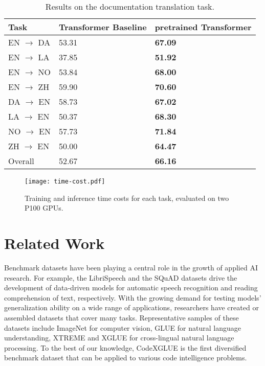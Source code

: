 \documentclass[sigconf,nonacm,screen]{acmart}
\begin{document}
\begin{table}[t]
	\begin{center}
	\caption{Results on the documentation translation task.}
		\begin{tabular}{lp{2cm}<{\centering}p{2cm}<{\centering}} 
			 \toprule 
			Task & Transformer Baseline & pretrained
			Transformer \\
\midrule
			EN $\rightarrow$ DA  & 53.31     &  \textbf{67.09}  \\
			EN $\rightarrow$ LA  & 37.85     &  \textbf{51.92}  \\
			EN $\rightarrow$ NO  & 53.84    &  \textbf{68.00}  \\
			EN $\rightarrow$ ZH  & 59.90     &  \textbf{70.60}  \\
			 \midrule
			DA $\rightarrow$ EN  & 58.73     &  \textbf{67.02}  \\
			LA $\rightarrow$ EN  & 50.37     &  \textbf{68.30}  \\
			NO $\rightarrow$ EN  & 57.73     &  \textbf{71.84}  \\
			ZH $\rightarrow$ EN  & 50.00     &  \textbf{64.47}  \\
			 \midrule
			Overall    & 52.67     &  \textbf{66.16}  \\
			\bottomrule
		\end{tabular}
	\label{documentation-translation-result}
	\end{center}
\end{table}


\begin{figure*}
    \centering
    \texttt{[image: time-cost.pdf]}
    \caption{Training and inference time costs for each task, evaluated on two P100 GPUs.}
    \label{fig:time}
\end{figure*}


\section{Related Work}
Benchmark datasets have been playing a central role in the growth of applied AI research. 
For example, the LibriSpeech \cite{panayotov2015librispeech} 
and the SQuAD \cite{rajpurkar2016squad} datasets
drive the development of data-driven models for automatic speech recognition and reading comprehension of text, respectively.
With the growing demand for testing models' generalization ability on a wide range of applications, researchers have created or assembled datasets that cover many tasks. Representative samples of these datasets include ImageNet \cite{deng2009imagenet} for computer vision, GLUE \cite{wang2018glue} for natural language understanding, XTREME \cite{hu2020xtreme} and XGLUE \cite{liang2020xglue} for cross-lingual natural language processing. To the best of our knowledge, CodeXGLUE is the first diversified benchmark dataset that can be applied to various code intelligence problems.
\end{document}
